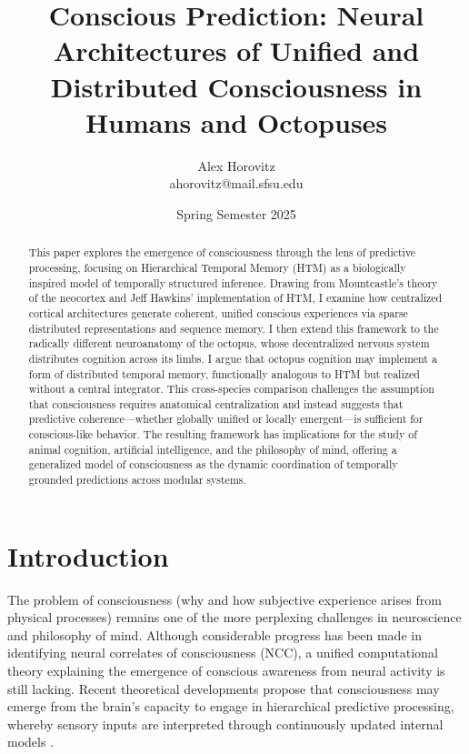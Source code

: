 \documentclass{article}
\title{Conscious Prediction: Neural Architectures of Unified and Distributed Consciousness in Humans and Octopuses}
\author{Alex Horovitz \\ \small ahorovitz@mail.sfsu.edu}
\date{Spring Semester 2025}
\begin{document}
\setlength{\parskip}{0.75em}
\maketitle
\begin{abstract}
This paper explores the emergence of consciousness through the lens of predictive processing, focusing on Hierarchical Temporal Memory (HTM) as a biologically inspired model of temporally structured inference. Drawing from Mountcastle’s theory of the neocortex and Jeff Hawkins’ implementation of HTM, I examine how centralized cortical architectures generate coherent, unified conscious experiences via sparse distributed representations and sequence memory. I then extend this framework to the radically different neuroanatomy of the octopus, whose decentralized nervous system distributes cognition across its limbs. I argue that octopus cognition may implement a form of distributed temporal memory, functionally analogous to HTM but realized without a central integrator. This cross-species comparison challenges the assumption that consciousness requires anatomical centralization and instead suggests that predictive coherence—whether globally unified or locally emergent—is sufficient for conscious-like behavior. The resulting framework has implications for the study of animal cognition, artificial intelligence, and the philosophy of mind, offering a generalized model of consciousness as the dynamic coordination of temporally grounded predictions across modular systems.
\end{abstract}


\section{Introduction}

The problem of consciousness (why and how subjective experience arises from physical processes) remains one of the more perplexing challenges in neuroscience and philosophy of mind. Although considerable progress has been made in identifying neural correlates of consciousness (NCC), a unified computational theory explaining the emergence of conscious awareness from neural activity is still lacking. Recent theoretical developments propose that consciousness may emerge from the brain's capacity to engage in hierarchical predictive processing, whereby sensory inputs are interpreted through continuously updated internal models \parencite{clark2016surfing, friston2010free}.
\end{document}
